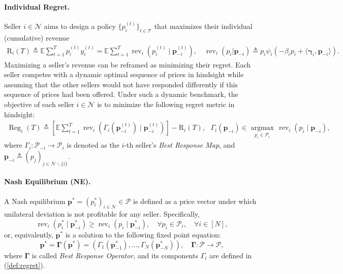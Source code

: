 \documentclass{article} %
\def\eqref#1{equation~\ref{#1}}
\renewcommand{\eqref}[1]{(\ref{#1})}
\begin{document}
\paragraph{Individual Regret.} Seller $i \in \mathcal{N}$ aims to design a policy $\{p_i^{(t)}\}_{t \in \mathcal{T}}$ that maximizes their individual (cumulative) revenue
\begin{align*}
\textstyle \mathrm{R}_i(T)\triangleq \mathbb{E} \sum_{t=1}^T p_i^{(t)} y_i^{(t)} = \mathbb{E} \sum_{t=1}^T \operatorname{rev}_i(p_i^{(t)}\mid \mathbf{p}^{(t)}_{-i}),\quad 
\operatorname{rev}_i(p_i|\mathbf{p}_{-i})\triangleq p_i\psi_i(-\beta_ip_i+\langle\boldsymbol{\gamma}_i,\mathbf{p}_{-i}\rangle).
\end{align*}
\noindent
Maximizing a seller's revenue can be reframed as minimizing their regret. Each seller competes with a dynamic optimal sequence of prices in hindsight while assuming that the other sellers would not have responded differently if this sequence of prices had been offered. Under such a dynamic benchmark, the objective of each seller $i \in \mathcal{N}$ is to minimize the following regret metric in hindsight:
\begin{align}\label{def:regret}
\textstyle \operatorname{Reg}_i(T) \triangleq \left[\mathbb{E} \sum_{t=1}^T \operatorname{rev}_i(\Gamma_i(\mathbf{p}^{(t)}_{-i})\mid \mathbf{p}^{(t)}_{-i})\right]-\mathrm{R}_i(T), \text{ } \Gamma_i(\mathbf{p}_{-i}) \in \underset{p_i \in \mathcal{P}_i}{\operatorname{argmax}} \, \operatorname{rev}_i(p_i\mid \mathbf{p}_{-i}),
\end{align}
where $\Gamma_i:\mathcal{P}_{-i}\rightarrow \mathcal{P}_i$ is denoted as the $i$-th seller's \emph{Best Response Map}, and $\mathbf{p}_{-i}\triangleq  (p_j )_{j \in \mathcal{N} \backslash\{i\}}$.

\paragraph{Nash Equilibrium (NE).} A Nash equilibrium $\mathbf{p}^*=\left(p_i^*\right)_{i \in \mathcal{N}} \in \mathcal{P}$ is defined as a price vector under which unilateral deviation is not profitable for any seller. Specifically,
$$
\operatorname{rev}_i(p_i^* \mid \mathbf{p}_{-i}^*) \geq \operatorname{rev}_i(p_i \mid \mathbf{p}_{-i}^*), \quad \forall p_i \in \mathcal{P}_i, \quad \forall i \in [N],
$$
or, equivalently, $\mathbf{p}^*$ is a solution to the following fixed point equation:
\begin{equation}\label{eq:NASH}
  \mathbf{p}^{*}= \boldsymbol{\Gamma}(\mathbf{p}^{*})= (\Gamma_1(\mathbf{p}^{*}_{-1}),\dots, \Gamma_N(\mathbf{p}^{*}_{-N})), \quad \boldsymbol{\Gamma}: \mathcal{P} \rightarrow \mathcal{P},
\end{equation}
where $\boldsymbol{\Gamma}$ is called \emph{Best Response Operator}, and its components $\Gamma_i$ are defined in \eqref{def:regret}.
\end{document}
